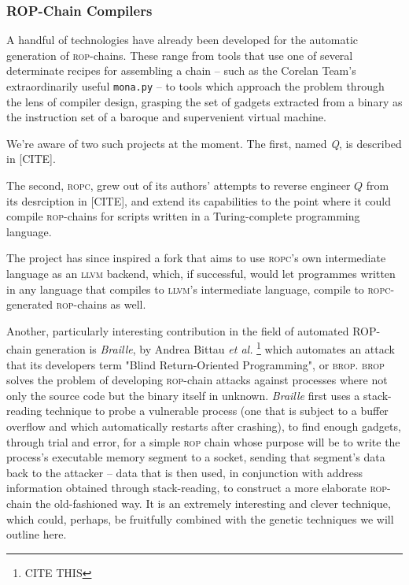 \subsubsection{ROP-Chain Compilers}

A handful of technologies have already been developed for the
automatic generation of \textsc{rop}-chains. These range from
tools that use one of several determinate recipes for assembling
a chain -- such as the {Corelan Team}'s extraordinarily useful
\texttt{mona.py} -- to tools which approach the problem through
the lens of compiler design, grasping the set of gadgets
extracted from a binary as the instruction set of a baroque and
supervenient virtual machine. %

We're aware of two such projects at the moment. The first, named
\emph{Q}, is described in [CITE]. 

The second, \textsc{ropc}, grew out of its authors' attempts to
reverse engineer $Q$ from its desrciption in [CITE], and extend
its capabilities to the point where it could compile
\textsc{rop}-chains for scripts written in a Turing-complete
programming language. 

The project has since inspired a fork that aims to use
\textsc{ropc}'s own intermediate language as an \textsc{llvm}
backend, which, if successful, would let programmes written in
any language that compiles to \textsc{llvm}'s intermediate
language, compile to \textsc{ropc}-generated \textsc{rop}-chains
as well.  

Another, particularly interesting contribution in the field of
automated ROP-chain generation is \emph{Braille}, by Andrea
Bittau \emph{et al.}%
\footnote{CITE THIS}
which automates an attack that its developers term "Blind
Return-Oriented Programming", or \textsc{brop}. \textsc{brop}
solves the problem of developing \textsc{rop}-chain attacks
against processes where not only the source code but the binary
itself in unknown. %
\emph{Braille} first uses a stack-reading technique to probe a
vulnerable process (one that is subject to a buffer overflow and
which automatically restarts after crashing), to find enough
gadgets, through trial and error, for a simple \textsc{rop} chain
whose purpose will be to write the process's executable memory
segment to a socket, sending that segment's data back to the
attacker -- data that is then used, in conjunction with address
information obtained through stack-reading, to construct a
more elaborate \textsc{rop}-chain the old-fashioned way. It is an
extremely interesting and clever technique, which could, perhaps,
be fruitfully combined with the genetic techniques we will
outline here. 

